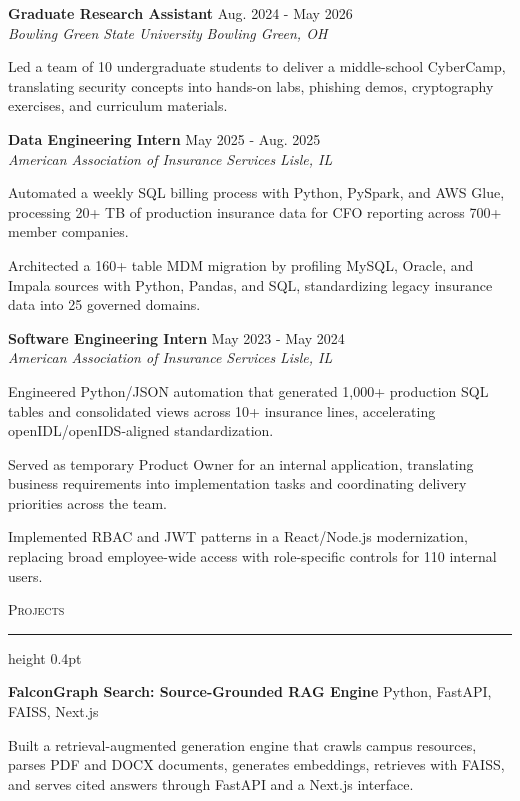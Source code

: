 \documentclass[letterpaper,11pt]{article}
\newcommand{\resumesection}[1]{%
  \par\vspace{2pt}%
  {\large\scshape #1}\par\vspace{2pt}%
  \hrule height 0.4pt\vspace{2pt}%
}
\newcommand{\resumeSubheading}[4]{
  \textbf{#1} \hfill #2\\
  \textit{#3} \hfill \textit{#4}
}
\newcommand{\projectHeading}[2]{
  \textbf{#1} \hfill #2
}
\begin{document}
\resumeSubheading
{Graduate Research Assistant}{Aug. 2024 - May 2026}
{Bowling Green State University}{Bowling Green, OH}
\begin{tightitemize}
  \item Led a team of 10 undergraduate students to deliver a middle-school CyberCamp, translating security concepts into hands-on labs, phishing demos, cryptography exercises, and curriculum materials.
\end{tightitemize}

\resumeSubheading
{Data Engineering Intern}{May 2025 - Aug. 2025}
{American Association of Insurance Services}{Lisle, IL}
\begin{tightitemize}
  \item Automated a weekly SQL billing process with Python, PySpark, and AWS Glue, processing 20+ TB of production insurance data for CFO reporting across 700+ member companies.
  \item Architected a 160+ table MDM migration by profiling MySQL, Oracle, and Impala sources with Python, Pandas, and SQL, standardizing legacy insurance data into 25 governed domains.
\end{tightitemize}

\resumeSubheading
{Software Engineering Intern}{May 2023 - May 2024}
{American Association of Insurance Services}{Lisle, IL}
\begin{tightitemize}
  \item Engineered Python/JSON automation that generated 1,000+ production SQL tables and consolidated views across 10+ insurance lines, accelerating openIDL/openIDS-aligned standardization.
  \item Served as temporary Product Owner for an internal application, translating business requirements into implementation tasks and coordinating delivery priorities across the team.
  \item Implemented RBAC and JWT patterns in a React/Node.js modernization, replacing broad employee-wide access with role-specific controls for 110 internal users.
\end{tightitemize}

\resumesection{Projects}
\projectHeading{FalconGraph Search: Source-Grounded RAG Engine}{Python, FastAPI, FAISS, Next.js}
\begin{tightitemize}
  \item Built a retrieval-augmented generation engine that crawls campus resources, parses PDF and DOCX documents, generates embeddings, retrieves with FAISS, and serves cited answers through FastAPI and a Next.js interface.
\end{tightitemize}
\end{document}
